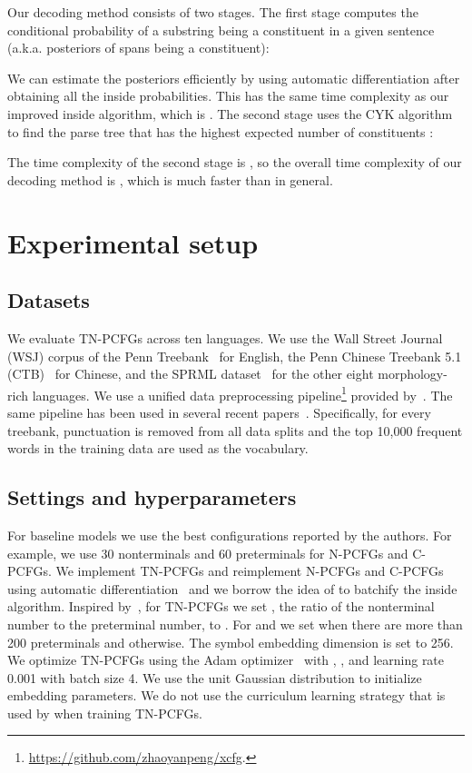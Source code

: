 \documentclass[11pt]{article}
\begin{document}
Our decoding method consists of two stages.
The first stage computes the conditional probability of a substring  being a constituent in a given sentence  (a.k.a. posteriors of spans being a constituent):

We can estimate the posteriors efficiently by using automatic differentiation after obtaining all the inside probabilities. This has the same time complexity as our improved inside algorithm, which is .
The second stage uses the CYK algorithm to find the parse tree that has the highest expected number of constituents \citep{DBLP:conf/acl/SmithE06a}:

The time complexity of the second stage is , so the overall time complexity of our decoding method is , which is much faster than  in general.

\section{Experimental setup}
\subsection{Datasets}
We evaluate TN-PCFGs across ten languages.
We use the Wall Street Journal (WSJ) corpus of the Penn Treebank~\citep{marcus-etal-1994-penn} for English,
the Penn Chinese Treebank 5.1 (CTB)~\citep{xue_xia_chiou_palmer_2005} for Chinese,
and the SPRML dataset~\citep{seddah-etal-2014-introducing} for the other eight morphology-rich languages.
We use a unified data preprocessing pipeline\footnote{ \href{https://github.com/zhaoyanpeng/xcfg}{https://github.com/zhaoyanpeng/xcfg}.} provided by~\citet{zhao2020xcfg}. 
The same pipeline has been used in several recent papers~\citep{shen2018neural,shen2018ordered,kim-etal-2019-compound,zhao-titov-2020-visually}.
Specifically, for every treebank, punctuation is removed from all data splits
and the top 10,000 frequent words in the training data are used as the vocabulary.


\subsection{Settings and hyperparameters}
For baseline models we use the best configurations reported by the authors.
For example, we use 30 nonterminals and 60 preterminals for N-PCFGs and C-PCFGs.
We implement TN-PCFGs and reimplement N-PCFGs and C-PCFGs using automatic differentiation~\citep{eisner-2016-inside} and we borrow the idea of \citet{ijcai2020-560} to batchify the inside algorithm.
Inspired by~\citet{kim-etal-2019-compound},
for TN-PCFGs we set , the ratio of the nonterminal number to the preterminal number, to .
For  and  we set  when there are more than 200 preterminals and  otherwise. The symbol embedding dimension  is set to 256.
We optimize TN-PCFGs using the Adam optimizer~\citep{kingma2014adam} with , , and learning rate 0.001 with batch size 4. We use the unit Gaussian distribution to initialize embedding parameters. We do not use the curriculum learning strategy that is used by \citet{kim-etal-2019-compound} when training TN-PCFGs.
\end{document}
